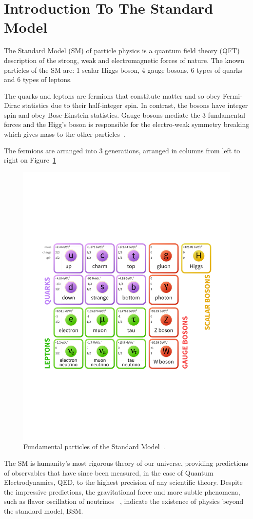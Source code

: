 \section{Introduction To The Standard Model}\label{secSM}



The Standard Model (SM) of particle physics is a quantum field theory (QFT) description of the strong, weak and electromagnetic forces of nature. The known particles of the SM are: 1 scalar Higgs boson, 4 gauge bosons, 6 types of quarks and 6 types of leptons. 

The quarks and leptons are fermions that constitute matter and so obey Fermi-Dirac statistics due to their half-integer spin. In contrast, the bosons have integer spin and obey Bose-Einstein statistics. Gauge bosons mediate the 3 fundamental forces and the Higg's boson is responsible for the electro-weak symmetry breaking which gives mass to the other particles~\cite{Griffiths:111880}. 

The fermions are arranged into 3 generations, arranged in columns from left to right on Figure~\ref{fig:SM}

\begin{figure}[htb]
\centering
\includegraphics[width=.60\textwidth]{smdiagram.pdf}
\caption{Fundamental particles of the Standard Model~\cite{modellinginvisible}.}
\label{fig:SM}
\end{figure}




The SM is humanity's most rigorous theory of our universe, providing predictions of observables that have since been measured, in the case of Quantum Electrodynamics, QED, to the highest precision of any scientific theory. Despite the impressive predictions, the gravitational force and more subtle phenomena, such as flavor oscillation of neutrinos ~\cite{Ashie:2005ik}, indicate the existence of physics beyond the standard model, BSM.

